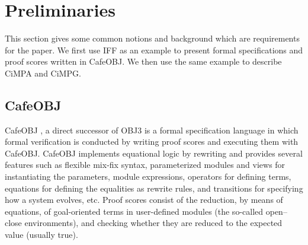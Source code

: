 \documentclass[a4paper,fleqn]{cas-dc}
\begin{document}

\section{Preliminaries}\label{pre}
This section gives some common notions and background which are requirements for the paper. We first use IFF as an example to present formal specifications and proof scores written in CafeOBJ. We then use the same example to describe CiMPA and CiMPG.

\subsection{CafeOBJ} \label{cafeobj}
CafeOBJ \cite{DiaconescuF98amast}, a direct successor of OBJ3 is a formal specification language in which formal verification is conducted by writing proof scores \cite{OgataF03fmoods} and executing them with CafeOBJ. CafeOBJ implements equational logic by rewriting and provides several features such as flexible mix-fix syntax, parameterized modules and views for instantiating the parameters, module expressions, operators for defining terms, equations for defining the equalities as rewrite rules, and transitions for specifying how a system evolves, etc. Proof scores consist of the reduction, by means of equations, of goal-oriented terms in user-defined modules (the so-called open–close environments), and checking whether they are reduced to the expected value (usually true). 
\end{document}
